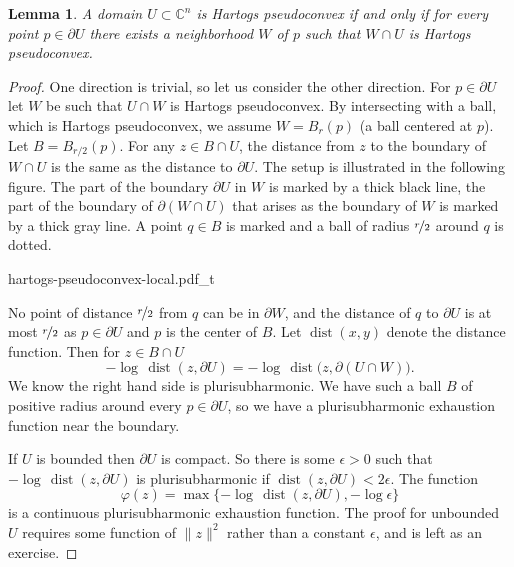 \documentclass[12pt,openany]{book}
\newcommand{\snorm}[1]{\lVert {#1} \rVert}
\newcommand{\C}{{\mathbb{C}}}
\theoremstyle{plain}
\newtheorem{lemma}[thm]{Lemma}
\theoremstyle{remark}
\theoremstyle{definition}
\theoremstyle{exercise}
\theoremstyle{example}
\begin{document}
\begin{lemma}
A domain $U \subset \C^n$ is Hartogs pseudoconvex if and only if
for every point $p \in \partial U$ there exists a neighborhood $W$ of $p$
such that $W \cap U$ is Hartogs pseudoconvex.
\end{lemma}

\begin{proof}
One direction is trivial,
so let us consider the other direction.  For $p \in \partial U$ let
$W$ be such that $U \cap W$
is Hartogs pseudoconvex.  By intersecting with a ball, which is
Hartogs pseudoconvex, we assume $W = B_r(p)$ (a ball centered at $p$).
Let $B = B_{r/2}(p)$.  For
any $z \in B \cap U$, the distance from $z$ to the boundary of $W \cap U$ is the same as
the distance to $\partial U$.  The setup is illustrated in the following
figure.  The part of the boundary $\partial U$ in $W$ is marked by a thick
black line, the part of the boundary of $\partial (W \cap U)$ that arises as
the boundary of $W$ is marked by a thick gray line.  A point $q \in B$ is
marked and a ball of radius $\nicefrac{r}{2}$ around $q$ is dotted.

\begin{center}
{hartogs-pseudoconvex-local.pdf_t}
\end{center}

No point of distance $\nicefrac{r}{2}$ from $q$ can be in $\partial W$, and 
the distance of $q$ to $\partial U$ is at most $\nicefrac{r}{2}$ as $p \in \partial U$
and $p$ is the center of $B$.
Let $\operatorname{dist}(x,y)$ denote the
distance function.  Then for $z \in B \cap U$
\begin{equation*}
- \log \, \operatorname{dist}(z, \partial U) = 
- \log \, \operatorname{dist}\bigl(z, \partial (U \cap W)\bigr).
\end{equation*}
We know the right hand side is plurisubharmonic.  We have such a ball $B$ of
positive radius around every $p \in \partial U$, so we have a
plurisubharmonic
exhaustion function near the boundary.

If $U$ is bounded then $\partial U$ is compact.  So there is some
$\epsilon > 0$ such that $- \log \, \operatorname{dist}(z, \partial U)$
is plurisubharmonic if $\operatorname{dist}(z, \partial U) < 2\epsilon$.
The function
\begin{equation*}
\varphi(z) = \max \{
- \log \, \operatorname{dist}(z, \partial U) , - \log \epsilon \} 
\end{equation*}
is a continuous plurisubharmonic exhaustion function.  The proof for
unbounded $U$ requires some function of $\snorm{z}^2$ rather than a constant
$\epsilon$,
and is left as an exercise.
\end{proof}
\end{document}
